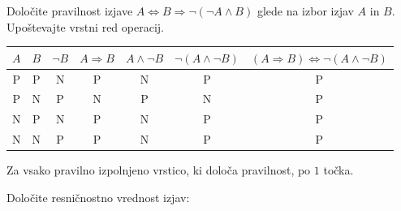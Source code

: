 \documentclass[addpoints]{exam}
\begin{document}
\begin{questions}

    
    \question[4]
    Določite pravilnost izjave $ A\Leftrightarrow B\Rightarrow \lnot(\lnot A\land B)$ glede na izbor izjav $A$ in $B$. Upoštevajte vrstni red operacij.

    \begin{solution}[12cm]
        \begin{table}[H]
            \begin{tabular}{ccccccc}
             $A$ & $B$ & $\lnot B$ & $A\Rightarrow B$ & $A\land \lnot B$ & $\lnot(A\land \lnot B)$ & $(A\Rightarrow  B)\Leftrightarrow \lnot(A\land \lnot B)$\\ \hline
             P & P & N & P & N & P & P \\ 
             P & N & P & N & P & N & P \\
             N & P & N & P & N & P & P \\
             N & N & P & P & N & P & P
            \end{tabular}
        \end{table}
        Za vsako pravilno izpolnjeno vrstico, ki določa pravilnost, po $1$ točka.

    \end{solution}





    \question[3]
    Določite resničnostno vrednost izjav:


\end{questions}
\end{document}

